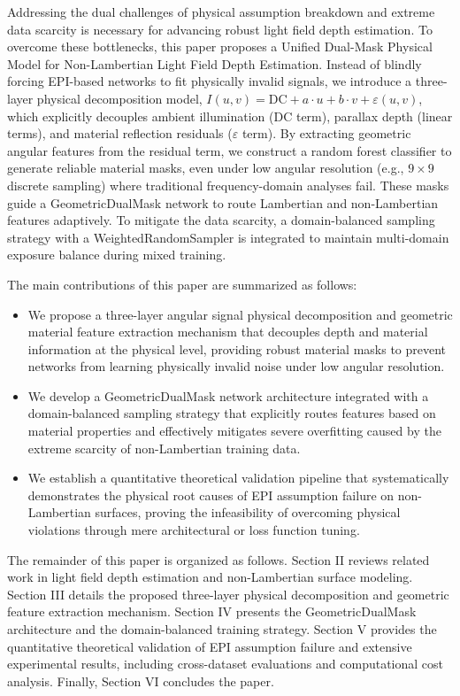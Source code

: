\documentclass[lettersize,journal]{IEEEtran}
\begin{document}
Addressing the dual challenges of physical assumption breakdown and extreme data scarcity is necessary for advancing robust light field depth estimation. To overcome these bottlenecks, this paper proposes a Unified Dual-Mask Physical Model for Non-Lambertian Light Field Depth Estimation. Instead of blindly forcing EPI-based networks to fit physically invalid signals, we introduce a three-layer physical decomposition model, $I(u,v) = \text{DC} + a \cdot u + b \cdot v + \varepsilon(u,v)$, which explicitly decouples ambient illumination (DC term), parallax depth (linear terms), and material reflection residuals ($\varepsilon$ term). By extracting geometric angular features from the residual term, we construct a random forest classifier to generate reliable material masks, even under low angular resolution (e.g., $9 \times 9$ discrete sampling) where traditional frequency-domain analyses fail. These masks guide a GeometricDualMask network to route Lambertian and non-Lambertian features adaptively. To mitigate the data scarcity, a domain-balanced sampling strategy with a WeightedRandomSampler is integrated to maintain multi-domain exposure balance during mixed training.

The main contributions of this paper are summarized as follows:
\begin{itemize}
\item We propose a three-layer angular signal physical decomposition and geometric material feature extraction mechanism that decouples depth and material information at the physical level, providing robust material masks to prevent networks from learning physically invalid noise under low angular resolution.
\item We develop a GeometricDualMask network architecture integrated with a domain-balanced sampling strategy that explicitly routes features based on material properties and effectively mitigates severe overfitting caused by the extreme scarcity of non-Lambertian training data.
\item We establish a quantitative theoretical validation pipeline that systematically demonstrates the physical root causes of EPI assumption failure on non-Lambertian surfaces, proving the infeasibility of overcoming physical violations through mere architectural or loss function tuning.
\end{itemize}

The remainder of this paper is organized as follows. Section II reviews related work in light field depth estimation and non-Lambertian surface modeling. Section III details the proposed three-layer physical decomposition and geometric feature extraction mechanism. Section IV presents the GeometricDualMask architecture and the domain-balanced training strategy. Section V provides the quantitative theoretical validation of EPI assumption failure and extensive experimental results, including cross-dataset evaluations and computational cost analysis. Finally, Section VI concludes the paper.
\end{document}
